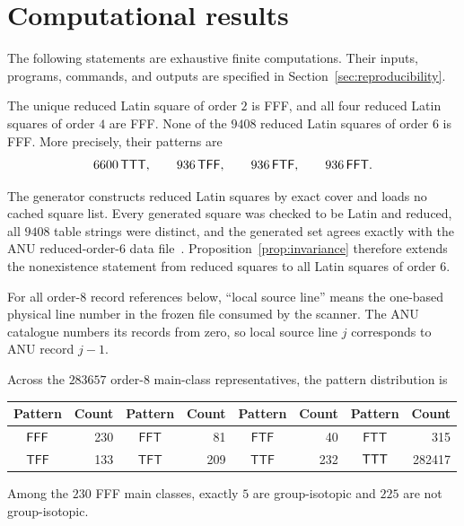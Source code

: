 \section{Computational results}

The following statements are exhaustive finite computations.  Their inputs,
programs, commands, and outputs are specified in
Section~\ref{sec:reproducibility}.

\begin{computationaltheorem}\label{cthm:small-orders}
The unique reduced Latin square of order $2$ is FFF, and all four reduced
Latin squares of order $4$ are FFF.  None of the $9408$ reduced Latin squares
of order $6$ is FFF.  More precisely, their patterns are
\[
 6600\,\mathsf{TTT},\qquad 936\,\mathsf{TFF},\qquad
 936\,\mathsf{FTF},\qquad 936\,\mathsf{FFT}.
\]
\end{computationaltheorem}

The generator constructs reduced Latin squares by exact cover and loads no
cached square list.  Every generated square was checked to be Latin and
reduced, all $9408$ table strings were distinct, and the generated set agrees
exactly with the ANU reduced-order-$6$ data file~\cite{McKayLatinData}.
Proposition~\ref{prop:invariance} therefore extends the nonexistence statement
from reduced squares to all Latin squares of order $6$.

For all order-$8$ record references below, ``local source line'' means the
one-based physical line number in the frozen file consumed by the scanner.
The ANU catalogue numbers its records from zero, so local source line $j$
corresponds to ANU record $j-1$.

\begin{computationaltheorem}\label{cthm:order8}
Across the $283657$ order-$8$ main-class representatives, the pattern
distribution is
\begin{center}
\begin{tabular}{cr@{\qquad}cr@{\qquad}cr@{\qquad}cr}
\toprule
Pattern & Count & Pattern & Count & Pattern & Count & Pattern & Count\\
\midrule
$\mathsf{FFF}$ & 230 & $\mathsf{FFT}$ & 81 & $\mathsf{FTF}$ & 40 &
$\mathsf{FTT}$ & 315\\
$\mathsf{TFF}$ & 133 & $\mathsf{TFT}$ & 209 & $\mathsf{TTF}$ & 232 &
$\mathsf{TTT}$ & 282417\\
\bottomrule
\end{tabular}
\end{center}
Among the $230$ FFF main classes, exactly $5$ are group-isotopic and $225$
are not group-isotopic.
\end{computationaltheorem}

